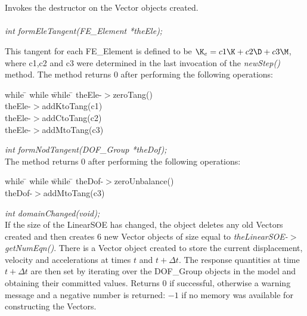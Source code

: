  \\
\\ 
Invokes the destructor on the Vector objects created. \\

\\
{\em int formEleTangent(FE\_Element *theEle);} 

This tangent for each FE\_Element is defined to be $\K_e = c1 \K + c2
\D + c3 \M$, where c1,c2 and c3 were determined in the last invocation
of the {\em newStep()} method.  The method returns $0$ after
performing the following operations:
\begin{tabbing}
while \= \+ while \= while \= \kill
theEle-$>$zeroTang() \\
theEle-$>$addKtoTang(c1) \\
theEle-$>$addCtoTang(c2) \\
theEle-$>$addMtoTang(c3) 
\end{tabbing}


{\em int formNodTangent(DOF\_Group *theDof);} \\
The method returns $0$ after performing the following operations:
\begin{tabbing}
while \= \+ while \= while \= \kill
theDof-$>$zeroUnbalance() \\
theDof-$>$addMtoTang(c3) 
\end{tabbing}


{\em int domainChanged(void);}\\
If the size of the LinearSOE has changed, the object deletes any old Vectors
created and then creates $6$ new Vector objects of size equal to {\em
theLinearSOE-$>$getNumEqn()}. There is a Vector object created to store
the current displacement, velocity and accelerations at times $t$ and
$t + \Delta t$. The response quantities at time $t + \Delta t$ are
then set by iterating over the DOF\_Group objects in the model and
obtaining their committed values. 
Returns $0$ if successful, otherwise a warning message and a negative
number is returned: $-1$ if no memory was available for constructing
the Vectors. \\


